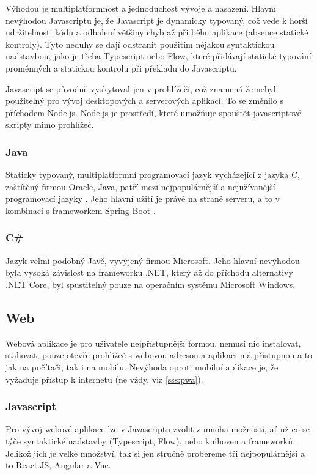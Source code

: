 Výhodou je multiplatformnost a jednoduchost vývoje a nasazení. Hlavní nevýhodou Javascriptu je, že Javascript je dynamicky typovaný, což vede k horší udržitelnosti kódu a odhalení většiny chyb až při běhu aplikace (absence statické kontroly). Tyto neduhy se dají odstranit použitím nějakou syntaktickou nadstavbou, jako je třeba Typescript nebo Flow, které přidávají statické typování proměnných a statickou kontrolu při překladu do Javascriptu.

Javascript se původně vyskytoval jen v prohlížeči, což znamená že nebyl použitelný pro vývoj desktopových a serverových aplikací. To se změnilo s příchodem Node.js. Node.js je prostředí, které umožňuje spouštět javascriptové skripty mimo prohlížeč.

\subsubsection*{Java}
Staticky typovaný, multiplatformní programovací jazyk vycházející z jazyka C, zaštítěný firmou Oracle, Java, patří mezi nejpopulárnější a nejužívanější programovací jazyky \cite{stackexchangeinc_2019_stack} . Jeho hlavní užití je právě na straně serveru, a to v kombinaci s frameworkem Spring Boot \cite{jetbrainssro_2019_demographics} .

\subsubsection*{C\# }
Jazyk velmi podobný Javě, vyvýjený firmou Microsoft. Jeho hlavní nevýhodou byla vysoká závislost na frameworku .NET, který až do příchodu alternativy .NET Core, byl spustitelný pouze na operačním systému Microsoft Windows.

\subsection{Web}
\label{ss:web}
Webová aplikace je pro uživatele nejpřístupnější formou, nemusí nic instalovat, stahovat, pouze otevře prohlížeč s webovou adresou a aplikaci má přístupnou a to jak na počítači, tak i na mobilu. Nevýhoda oproti mobilní aplikace je, že vyžaduje přístup k internetu (ne vždy, viz \ref{sss:pwa}).

\subsubsection*{Javascript}
Pro vývoj webové aplikace lze v Javascriptu zvolit z mnoha možností, ať už co se týče syntaktické nadstavby (Typescript, Flow), nebo knihoven a frameworků. Jelikož jich je velké množství, tak si jen stručně probereme tři nejpopulárnější a to React.JS, Angular a Vue.

